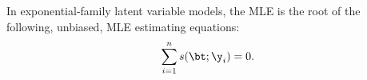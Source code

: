 \begin{definition}
In exponential-family latent variable models, the MLE is the root of the following, unbiased, MLE estimating equations:
\begin{equation}
\sum_{i=1}^n s(\bt; \y_i)
= 0.
\label{eqn:MLE-estimating-equations-expfam}
\end{equation}
\end{definition}